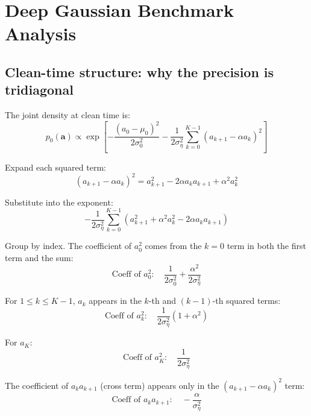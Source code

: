 \documentclass[11pt,a4paper]{article}
\theoremstyle{plain}
\theoremstyle{definition}
\newcommand{\vct}[1]{\mathbf{#1}}
\begin{document}
\section{Deep Gaussian Benchmark Analysis}
\label{sec:gaussian-benchmark}

\subsection{Clean-time structure: why the precision is tridiagonal}
\label{sec:tridiagonal}

The joint density at clean time is:
\begin{equation}
p_0(\vct{a}) \propto \exp\left[-\frac{(a_0 - \mu_0)^2}{2\sigma_0^2} - \frac{1}{2\sigma_\eta^2}\sum_{k=0}^{K-1} (a_{k+1} - \alpha a_k)^2\right]
\end{equation}

Expand each squared term:
\begin{equation}
(a_{k+1} - \alpha a_k)^2 = a_{k+1}^2 - 2\alpha a_k a_{k+1} + \alpha^2 a_k^2
\end{equation}

Substitute into the exponent:
\begin{equation}
-\frac{1}{2\sigma_\eta^2}\sum_{k=0}^{K-1} (a_{k+1}^2 + \alpha^2 a_k^2 - 2\alpha a_k a_{k+1})
\end{equation}

Group by index. The coefficient of $a_0^2$ comes from the $k=0$ term in both the first term and the sum:
\begin{equation}
\text{Coeff of } a_0^2: \quad \frac{1}{2\sigma_0^2} + \frac{\alpha^2}{2\sigma_\eta^2}
\end{equation}

For $1 \le k \le K-1$, $a_k$ appears in the $k$-th and $(k-1)$-th squared terms:
\begin{equation}
\text{Coeff of } a_k^2: \quad \frac{1}{2\sigma_\eta^2}(1 + \alpha^2)
\end{equation}

For $a_K$:
\begin{equation}
\text{Coeff of } a_K^2: \quad \frac{1}{2\sigma_\eta^2}
\end{equation}

The coefficient of $a_k a_{k+1}$ (cross term) appears only in the $(a_{k+1} - \alpha a_k)^2$ term:
\begin{equation}
\text{Coeff of } a_k a_{k+1}: \quad -\frac{\alpha}{\sigma_\eta^2}
\end{equation}
\end{document}
